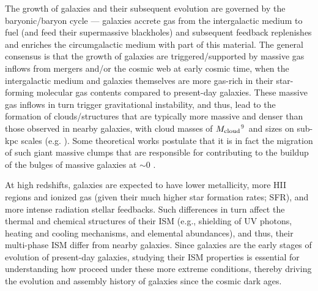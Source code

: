 \documentclass[apj]{emulateapj} %
\begin{document}
The growth of galaxies and their subsequent evolution are governed by the baryonic/baryon cycle ---
galaxies accrete gas from the intergalactic medium to fuel \SF (and feed their supermassive blackholes)
and subsequent feedback replenishes and enriches the circumgalactic medium with part of this material.
The general consensus is that the growth of \highz galaxies are triggered/supported by massive
gas inflows from mergers and/or the cosmic web at early cosmic time, when the intergalactic 
medium and galaxies themselves are more gas-rich in their star-forming molecular 
gas contents compared to present-day galaxies.
These massive gas inflows in turn trigger gravitational instability, and thus, lead
to the formation of clouds/structures that are typically more massive and denser than those 
observed in nearby galaxies, with cloud masses of $M_{\rm cloud}$$^9$\,\Msun 
and sizes on sub-kpc scales (e.g. \citealt{Gabor13a, Hopkins14a, Inoue16a}).
Some theoretical works postulate that it is in fact the
migration of such giant massive clumps that are responsible for contributing to the 
buildup of the bulges of massive galaxies at \z$\sim$0 \citep[e.g.,][]{Ceverino10a}.


At high redshifts, galaxies are expected to have lower metallicity, 
more {\sc HII} regions and ionized gas 
(given their much higher star formation rates; SFR), and 
more intense radiation stellar feedbacks.
Such differences in turn affect the thermal and chemical structures of their ISM (e.g., shielding of UV photons, heating and cooling mechanisms, and elemental abundances),
and thus, their multi-phase ISM differ from nearby galaxies.
Since \highz galaxies are the early stages of evolution of present-day galaxies, 
studying their ISM properties is essential for understanding how \SF proceed under these more extreme
conditions, thereby driving the evolution and assembly history 
of galaxies since the cosmic dark ages.
\end{document}
